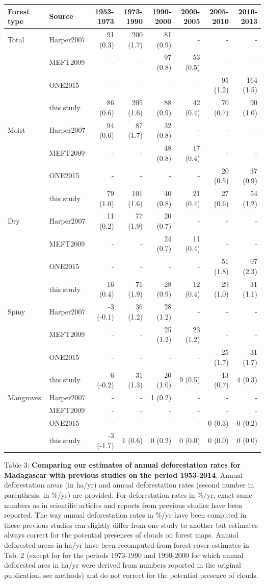 \documentclass[]{article}
\begin{document}
\begin{longtable}[]{@{}llrrrrrr@{}}
\toprule
Forest type & Source & 1953-1973 & 1973-1990 & 1990-2000 & 2000-2005 &
2005-2010 & 2010-2013\tabularnewline
\midrule
\endhead
Total & Harper2007 & 91 (0.3) & 200 (1.7) & 81 (0.9) & - & - &
-\tabularnewline
& MEFT2009 & - & - & 97 (0.8) & 53 (0.5) & - & -\tabularnewline
& ONE2015 & - & - & - & - & 95 (1.2) & 164 (1.5)\tabularnewline
& this study & 86 (0.6) & 205 (1.6) & 88 (0.9) & 42 (0.4) & 70 (0.7) &
90 (1.0)\tabularnewline
Moist & Harper2007 & 94 (0.6) & 87 (1.7) & 32 (0.8) & - & - &
-\tabularnewline
& MEFT2009 & - & - & 48 (0.8) & 17 (0.4) & - & -\tabularnewline
& ONE2015 & - & - & - & - & 20 (0.5) & 37 (0.9)\tabularnewline
& this study & 79 (1.0) & 101 (1.6) & 40 (0.8) & 21 (0.4) & 27 (0.6) &
54 (1.2)\tabularnewline
Dry & Harper2007 & 11 (0.2) & 77 (1.9) & 20 (0.7) & - & - &
-\tabularnewline
& MEFT2009 & - & - & 24 (0.7) & 11 (0.4) & - & -\tabularnewline
& ONE2015 & - & - & - & - & 51 (1.8) & 97 (2.3)\tabularnewline
& this study & 16 (0.4) & 71 (1.9) & 28 (0.9) & 12 (0.4) & 29 (1.0) & 31
(1.1)\tabularnewline
Spiny & Harper2007 & -3 (-0.1) & 36 (1.2) & 28 (1.2) & - & - &
-\tabularnewline
& MEFT2009 & - & - & 25 (1.2) & 23 (1.2) & - & -\tabularnewline
& ONE2015 & - & - & - & - & 25 (1.7) & 31 (1.7)\tabularnewline
& this study & -6 (-0.2) & 31 (1.3) & 20 (1.0) & 9 (0.5) & 13 (0.7) & 4
(0.3)\tabularnewline
Mangroves & Harper2007 & - & - & 1 (0.2) & - & - & -\tabularnewline
& MEFT2009 & - & - & - & - & - & -\tabularnewline
& ONE2015 & - & - & - & - & 0 (0.3) & 0 (0.2)\tabularnewline
& this study & -3 (-1.7) & 1 (0.6) & 0 (0.2) & 0 (0.0) & 0 (0.0) & 0
(0.0)\tabularnewline
\bottomrule
\end{longtable}

Table 3: \textbf{Comparing our estimates of annual deforestation rates
for Madagascar with previous studies on the period 1953-2014}. Annual
deforestation areas (in ha/yr) and annual deforestation rates (second
number in parenthesis, in \%/yr) are provided. For deforestation rates
in \%/yr, exact same numbers as in scientific articles and reports from
previous studies have been reported. The way annual deforestation rates
in \%/yr have been computed in these previous studies can slightly
differ from one study to another but estimates always correct for the
potential presences of clouds on forest maps. Annual deforested areas in
ha/yr have been recomputed from forest-cover estimates in Tab. 2 (except
for \citet{Harper2007} for the periods 1973-1990 and 1990-2000 for which
annual deforested ares in ha/yr were derived from numbers reported in
the original publication, see methods) and do not correct for the
potential presence of clouds.
\end{document}

